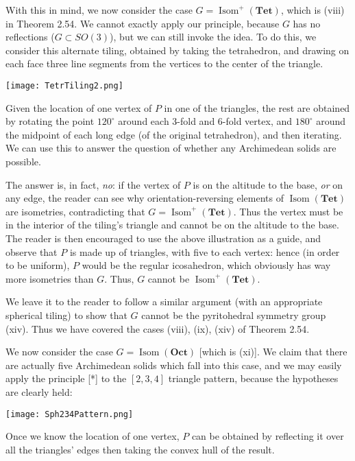 \documentclass[leqno]{book}
\begin{document}
With this in mind, we now consider the case $G=\operatorname{Isom}^+(\mathbf{Tet})$, which is (viii) in Theorem 2.54.  We cannot exactly apply our principle, because $G$ has no reflections ($G\subset SO(3)$), but we can still invoke the idea.  To do this, we consider this alternate tiling, obtained by taking the tetrahedron, and drawing on each face three line segments from the vertices to the center of the triangle.
\begin{center}
\texttt{[image: TetrTiling2.png]}
\end{center}
Given the location of one vertex of $P$ in one of the triangles, the rest are obtained by rotating the point $120^\circ$ around each 3-fold and 6-fold vertex, and $180^\circ$ around the midpoint of each long edge (of the original tetrahedron), and then iterating.  We can use this to answer the question of whether any Archimedean solids are possible.

The answer is, in fact, \emph{no}: if the vertex of $P$ is on the altitude to the base, \emph{or} on any edge, the reader can see why orientation-reversing elements of $\operatorname{Isom}(\mathbf{Tet})$ are isometries, contradicting that $G=\operatorname{Isom}^+(\mathbf{Tet})$.  Thus the vertex must be in the interior of the tiling's triangle and cannot be on the altitude to the base.  The reader is then encouraged to use the above illustration as a guide, and observe that $P$ is made up of triangles, with five to each vertex: hence (in order to be uniform), $P$ would be the regular icosahedron, which obviously has way more isometries than $G$.  Thus, $G$ cannot be $\operatorname{Isom}^+(\mathbf{Tet})$.

We leave it to the reader to follow a similar argument (with an appropriate spherical tiling) to show that $G$ cannot be the pyritohedral symmetry group (xiv).  Thus we have covered the cases (viii), (ix), (xiv) of Theorem 2.54.

We now consider the case $G=\operatorname{Isom}(\mathbf{Oct})$ [which is (xi)].  We claim that there are actually five Archimedean solids which fall into this case, and we may easily apply the principle [*] to the $[2,3,4]$ triangle pattern, because the hypotheses are clearly held:
\begin{center}
\texttt{[image: Sph234Pattern.png]}
\end{center}
Once we know the location of one vertex, $P$ can be obtained by reflecting it over all the triangles' edges then taking the convex hull of the result.
\end{document}
